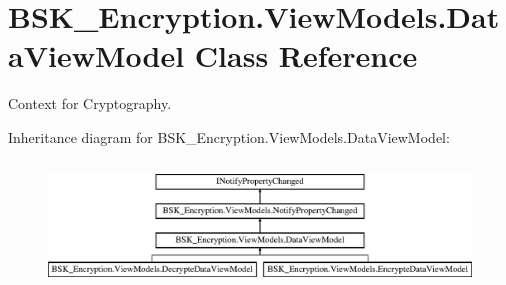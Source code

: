 \hypertarget{class_b_s_k___encryption_1_1_view_models_1_1_data_view_model}{}\section{B\+S\+K\+\_\+\+Encryption.\+View\+Models.\+Data\+View\+Model Class Reference}
\label{class_b_s_k___encryption_1_1_view_models_1_1_data_view_model}


Context for Cryptography.  


Inheritance diagram for B\+S\+K\+\_\+\+Encryption.\+View\+Models.\+Data\+View\+Model\+:\begin{figure}[H]
\begin{center}
\leavevmode
\includegraphics[height=3.393939cm]{class_b_s_k___encryption_1_1_view_models_1_1_data_view_model}
\end{center}
\end{figure}
